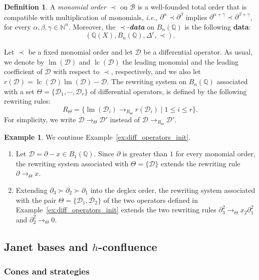 \documentclass[10pt]{easychair}
\theoremstyle{definition}
\newtheorem{definition}[theorem]{Definition}
\newtheorem{example}[theorem]{Example}
\newcommand\ie{\emph{i.e.}}
\newcommand\data{{\color{red}\bf data}}
\newcommand\D{\mathcal{D}}
\DeclareMathOperator{\lm}{lm}
\DeclareMathOperator{\lc}{lc}
\newcommand\basis{\mathscr{B}}
\newcommand\Q{\mathbb{Q}}
\newcommand\N{\mathbb{N}}
\newcommand\Weyl[1]{B_{#1}(\Q)}
\newcommand\rewTheta{\to_{\Theta}}
\begin{document}
\begin{definition}
  A {\em monomial order} $\prec$ on $\basis$ is a well-founded total
  order that is compatible with multiplication of monomials, \ie,
  $\partial^{\alpha}\prec\partial^{\beta}$ implies 
  $\partial^{\alpha+\gamma}\prec\partial^{\beta+\gamma}$, for every
  $\alpha,\beta,\gamma\in\N^n$. Moreover, the $\prec$-{\it \data} on
  $\Weyl{n}$ is the following \data:
  \[(\Q(X),\Weyl{n},\Delta^c,\prec).\]
\end{definition}
\smallskip

Let $\prec$ be a fixed monomial order and let $\D$ be a differential
operator. As usual, we denote by $\lm(\D)$ and $\lc(\D)$ the leading
monomial and the leading coefficient of $\D$ with respect to $\prec$,
respectively, and we also let $r(\D)=\lc(\D)\lm(\D)-\D$. The rewriting
system on $\Weyl{n}$ associated with a set $\Theta=\{\D_1,\cdots,\D_r\}$
of differential operators, is defined by the following rewriting rules:
\[R_{\Theta}=\Big\{\lm(\D_i)\to_{R_\Theta}r(\D_i)\mid 1\leq i\leq r
\Big\}.\]
For simplicity, we write $\D\rewTheta\D'$ instead of
$\D\to_{R_\Theta}\D'$.
\smallskip

\begin{example}
  We continue Example~\ref{ex:diff_operators_init}.
  \begin{enumerate}
  \item Let $\D=\partial-x\in\Weyl{1}$. Since $\partial$ is greater than
    $1$ for every monomial order, the rewriting system associated with
    $\Theta=\{\D\}$ extends the rewriting rule $\partial\rewTheta x$.
  \item Extending $\partial_3\succ\partial_2\succ\partial_1$ into the
    deglex order, the rewriting system associated with the pair
    $\Theta=\{\D_1,\D_2\}$ of the two operators defined in
    Example~\ref{ex:diff_operators_init} extends the two rewriting rules
    $\partial_3^2\rewTheta x_2\partial_1^2$ and
    $\partial_2^2\rewTheta 0$.
  \end{enumerate}
\end{example}
\smallskip

\subsection{Janet bases and $h$-confluence}
\label{sec:Janet_bases_and_h_confluence}

\subsubsection{Cones and strategies}
\end{document}
